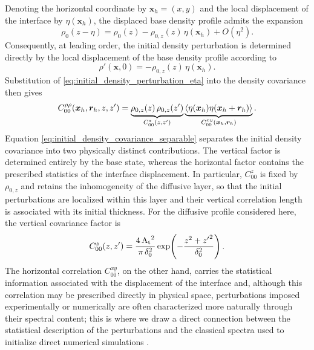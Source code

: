 Denoting the horizontal coordinate by \(\boldsymbol{x}_h=(x,y)\) and the local displacement of the interface by \(\eta(\boldsymbol{x}_h)\), the displaced base density profile admits the expansion
\begin{equation}
    \rho_0(z-\eta)
    =
    \rho_0(z)
    -
    \rho_{0,z}(z)\,\eta(\boldsymbol{x}_h)
    +
    O\!\left(\eta^2\right).
    \label{eq:initial_density_displacement}
\end{equation}
Consequently, at leading order, the initial density perturbation is determined directly by the local displacement of the base density profile according to
\begin{equation}
    \rho'(\boldsymbol{x},0)
    =
    -
    \rho_{0,z}(z)\,\eta(\boldsymbol{x}_h).
    \label{eq:initial_density_perturbation_eta}
\end{equation}
Substitution of \eqref{eq:initial_density_perturbation_eta} into the density covariance then gives
\begin{equation}
    C_{00}^{\rho\rho}(\boldsymbol{x}_h,\boldsymbol{r}_h,z,z')
    =
    \underbrace{
        \rho_{0,z}(z)\,\rho_{0,z}(z')
    }_{
        C_{00}^{z}(z,z')
    }
    \underbrace{
        \left\langle 
            \eta(\boldsymbol{x}_h)
            \eta(\boldsymbol{x}_h+\boldsymbol{r}_h)
         \right\rangle
    }_{
        C_{00}^{xy}(\boldsymbol{x}_h,\boldsymbol{r}_h)
    }.
    \label{eq:initial_density_covariance_separable}
\end{equation}
Equation \eqref{eq:initial_density_covariance_separable} separates the initial density covariance into two physically distinct contributions. The vertical factor is determined entirely by the base state, whereas the horizontal factor contains the prescribed statistics of the interface displacement. In particular, \(C_{00}^{z}\) is fixed by \(\rho_{0,z}\) and retains the inhomogeneity of the diffusive layer, so that the initial perturbations are localized within this layer and their vertical correlation length is associated with its initial thickness. For the diffusive profile considered here, the vertical covariance factor is
\begin{equation}
    C_{00}^{z}(z,z')
    =
    \frac{4\,\mathrm{A_t}^{2}}{\pi\,\delta_0^{2}}
    \exp\!\left(
        -\frac{z^2+{z'}^2}{\delta_0^2}
    \right).
    \label{eq:vertical_covariance_factor_erf}
\end{equation}
The horizontal correlation \(C_{00}^{xy}\), on the other hand, carries the statistical information associated with the displacement of the interface and, although this correlation may be prescribed directly in physical space, perturbations imposed experimentally or numerically are often characterized more naturally through their spectral content; this is where we draw a direct connection between the statistical description of the perturbations and the classical spectra used to initialize direct numerical simulations \citep{rogallo-1981}.


